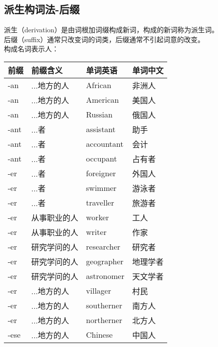 \documentclass[UTF8]{ctexart}
\begin{document}
\newpage

\subsection{派生构词法-后缀}
    派生（{\ttfamily derivation}）是由词根加词缀构成新词，构成的新词称为派生词。\\[3mm]
    后缀（{\ttfamily suffix}）通常只改变词的词类，后缀通常不引起词意的改变。\\[3mm]
    构成名词表示人：\vspace{5pt}
    \begin{table}[h!]
        \begin{center}
            \ttfamily
            \begin{tabular}{p{40pt}|p{80pt}|p{80pt}|p{80pt}}
                \hline
                前缀&前缀含义&单词英语&单词中文\\ \hline
                -an&...地方的人&African&非洲人\\ \hline
                -an&...地方的人&American&美国人\\ \hline
                -an&...地方的人&Russian&俄国人\\ \hline
                -ant&...者&assistant&助手\\ \hline
                -ant&...者&accountant&会计\\ \hline
                -ant&...者&occupant&占有者\\ \hline
                -er&...者&foreigner&外国人\\ \hline
                -er&...者&swimmer&游泳者\\ \hline
                -er&...者&traveller&旅游者\\ \hline
                -er&从事职业的人&worker&工人\\ \hline
                -er&从事职业的人&writer&作家\\ \hline
                -er&研究学问的人&researcher&研究者\\ \hline
                -er&研究学问的人&geographer&地理学者\\ \hline
                -er&研究学问的人&astronomer&天文学者\\ \hline
                -er&...地方的人&villager&村民\\ \hline
                -er&...地方的人&southerner&南方人\\ \hline
                -er&...地方的人&northerner&北方人\\ \hline
                -ese&...地方的人&Chinese&中国人\\ \hline

\end{tabular}
\end{center}
\end{table}
\end{document}
